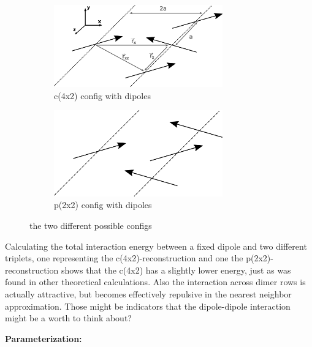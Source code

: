 	\begin{figure}[htb]
		\begin{subfigure}{0.5\textwidth}
			\centering
			\includegraphics[width=0.8\textwidth]{graphics/c(4x2)-dipole.png}
			\caption{c(4x2) config with dipoles}
			\label{dipole4x2}
		\end{subfigure}
		\begin{subfigure}{0.5\textwidth}
			\centering
			\includegraphics[width=0.8\textwidth]{graphics/2x2-dipole.png}
			\caption{p(2x2) config with dipoles}
			\label{dipole2x2}
		\end{subfigure}
		\caption{the two different possible configs}
		\label{dimer-configs}
	\end{figure}
	Calculating the total interaction energy between a fixed dipole and two different triplets, one representing the c(4x2)-reconstruction and one the p(2x2)-reconstruction shows that the c(4x2) has a slightly lower energy, just as was found in other theoretical calculations. Also the interaction across dimer rows is actually attractive, but becomes effectively repulsive in the nearest neighbor approximation. Those might be indicators that the dipole-dipole interaction might be a worth to think about?
	
	\textbf{Parameterization:}
	

